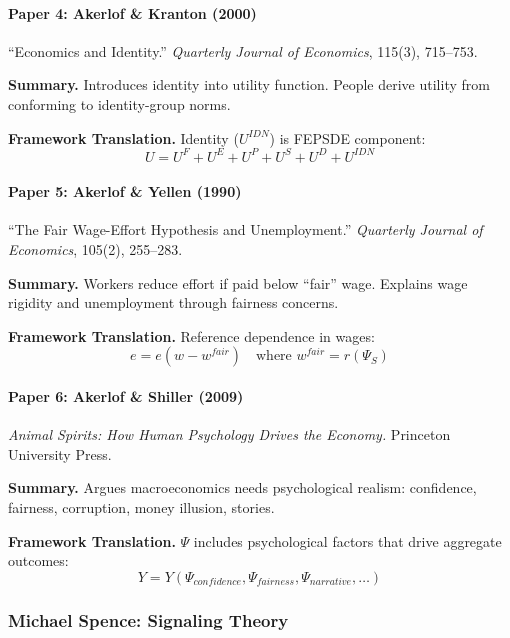 \paragraph{Paper 4: Akerlof \& Kranton (2000)}

``Economics and Identity.''
\textit{Quarterly Journal of Economics}, 115(3), 715--753.

\textbf{Summary.}
Introduces identity into utility function. People derive utility from 
conforming to identity-group norms.

\textbf{Framework Translation.}
Identity ($U^{IDN}$) is FEPSDE component:
\begin{equation}
U = U^F + U^E + U^P + U^S + U^D + U^{IDN}
\end{equation}

\paragraph{Paper 5: Akerlof \& Yellen (1990)}

``The Fair Wage-Effort Hypothesis and Unemployment.''
\textit{Quarterly Journal of Economics}, 105(2), 255--283.

\textbf{Summary.}
Workers reduce effort if paid below ``fair'' wage. Explains wage rigidity 
and unemployment through fairness concerns.

\textbf{Framework Translation.}
Reference dependence in wages:
\begin{equation}
e = e(w - w^{fair}) \quad \text{where } w^{fair} = r(\Psi_S)
\end{equation}

\paragraph{Paper 6: Akerlof \& Shiller (2009)}

\textit{Animal Spirits: How Human Psychology Drives the Economy.}
Princeton University Press.

\textbf{Summary.}
Argues macroeconomics needs psychological realism: confidence, fairness, 
corruption, money illusion, stories.

\textbf{Framework Translation.}
$\Psi$ includes psychological factors that drive aggregate outcomes:
\begin{equation}
Y = Y(\Psi_{confidence}, \Psi_{fairness}, \Psi_{narrative}, \ldots)
\end{equation}

\subsubsection{Michael Spence: Signaling Theory}

